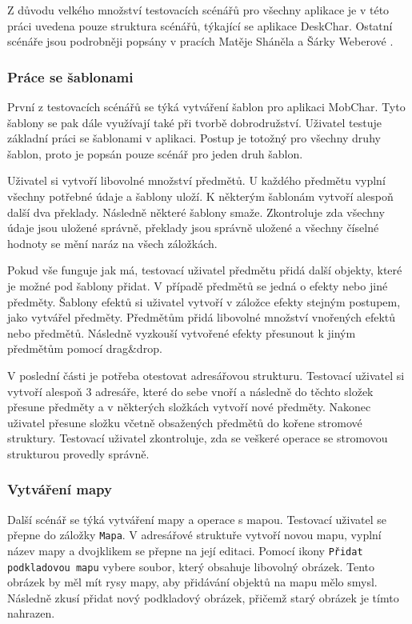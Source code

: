 \documentclass[thesis=B,czech]{resources/FITthesis}[2012/06/26]
\begin{document}
Z důvodu velkého množství testovacích scénářů pro všechny aplikace je v této práci uvedena pouze struktura scénářů, týkající se aplikace DeskChar. Ostatní scénáře jsou podrobněji popsány v pracích Matěje Sháněla \cite{Shanel_2017} a Šárky Weberové \cite{Weberova_2017}. 

\subsubsection{Práce se šablonami}
První z testovacích scénářů se týká vytváření šablon pro aplikaci MobChar. Tyto šablony se pak dále využívají také při tvorbě dobrodružství. Uživatel testuje základní práci se šablonami v aplikaci. Postup je totožný pro všechny druhy šablon, proto je popsán pouze scénář pro jeden druh šablon. \par

Uživatel si vytvoří libovolné množství předmětů. U každého předmětu vyplní všechny potřebné údaje a šablony uloží. K některým šablonám vytvoří alespoň další dva překlady. Následně některé šablony smaže. Zkontroluje zda všechny údaje jsou uložené správně, překlady jsou správně uložené a všechny číselné hodnoty se mění naráz na všech záložkách. \par

Pokud vše funguje jak má, testovací uživatel předmětu přidá další objekty, které je možné pod šablony přidat. V případě předmětů se jedná o efekty nebo jiné předměty. Šablony efektů si uživatel vytvoří v záložce efekty stejným postupem, jako vytvářel předměty. Předmětům přidá libovolné množství vnořených efektů nebo předmětů. Následně vyzkouší vytvořené efekty přesunout k jiným předmětům pomocí drag\&drop. \par 

V poslední části je potřeba otestovat adresářovou strukturu. Testovací uživatel si vytvoří alespoň 3 adresáře, které do sebe vnoří a následně do těchto složek přesune předměty a v některých složkách vytvoří nové předměty. Nakonec uživatel přesune složku včetně obsažených předmětů do kořene stromové struktury. Testovací uživatel zkontroluje, zda se veškeré operace se stromovou strukturou provedly správně. 

\subsubsection{Vytváření mapy}
Další scénář se týká vytváření mapy a operace s mapou.  Testovací uživatel se přepne do záložky \texttt{Mapa}. V adresářové struktuře vytvoří novou mapu, vyplní název mapy a dvojklikem se přepne na její editaci. Pomocí ikony \texttt{Přidat podkladovou mapu} vybere soubor, který obsahuje libovolný obrázek. Tento obrázek by měl mít rysy mapy, aby přidávání objektů na mapu mělo smysl. Následně zkusí přidat nový podkladový obrázek, přičemž starý obrázek je tímto nahrazen. \par
\end{document}
